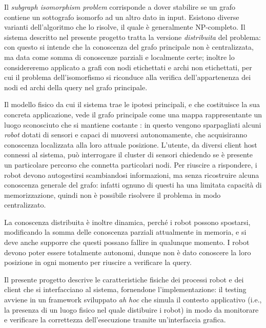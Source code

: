 Il \emph{subgraph isomorphism problem} corrisponde a dover
stabilire se un grafo contiene un sottografo isomorfo ad
un altro dato in input.
Esistono diverse varianti dell'algoritmo che lo risolve, il quale è
generalmente NP-completo.
Il sistema descritto nel presente progetto
tratta la versione \emph{distribuita} del problema:
con questo si intende che la conoscenza del grafo principale non
è centralizzata, ma data come somma di conoscenze parziali e
localmente certe; inoltre lo considereremo applicato
a grafi con nodi etichettati e archi non etichettati,
per cui il problema dell'isomorfismo si riconduce alla verifica
dell'appartenenza dei nodi ed archi della query nel grafo principale.

Il modello fisico da cui il sistema trae le ipotesi principali,
e che costituisce la sua concreta applicazione, vede il grafo
principale come una mappa rappresentante un luogo sconosciuto
che si mantiene costante
:
in questo vengono sparpagliati alcuni \emph{robot}
dotati di sensori e capaci di muoversi autonomamente, che acquisiranno
conoscenza localizzata alla loro attuale posizione.
L'utente, da diversi client host connessi al sistema, può
interrogare il cluster di sensori chiedendo se è
presente un particolare percorso che connetta particolari nodi.
Per riuscire a rispondere, i robot devono autogestirsi scambiandosi
informazioni, ma senza ricostruire alcuna conoscenza generale del grafo:
infatti ognuno di questi ha una limitata capacità di memorizzazione,
quindi non è possibile risolvere il problema in modo centralizzato.

La conoscenza distribuita è inoltre dinamica, perché i robot
possono spostarsi, modificando la somma delle conoscenza parziali
attualmente in memoria, e si deve anche supporre che questi possano
fallire in qualunque momento.
I robot devono poter essere totalmente autonomi, dunque non
è dato conoscere la loro posizione in ogni momento per
riuscire a verificare la query.

Il presente progetto descrive le caratteristiche fisiche dei
processi robot e dei client che si interfacciano al sistema,
fornendone l'implementazione: il testing
avviene in un framework sviluppato \emph{ah hoc}
che simula il contesto applicativo (i.e., la presenza di un luogo
fisico nel quale distibuire i robot)
in modo da monitorare e verificare la correttezza dell'esecuzione
tramite un'interfaccia grafica.
